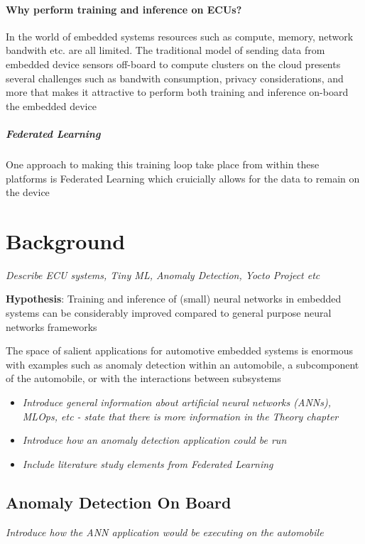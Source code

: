 \subsubsection{Why perform training and inference on ECUs?}

In the world of embedded systems resources such as compute, memory, network bandwith etc. are all limited. The traditional model of sending data from embedded device sensors off-board to compute clusters on the cloud presents several challenges such as bandwith consumption, privacy considerations, and more that makes it attractive to perform both training and inference on-board the embedded device

\paragraph{Federated Learning}{
	One approach to making this training loop take place from within these platforms is Federated Learning which cruicially allows for the data to remain on the device
}

\chapter{Background}
\textit{Describe ECU systems, Tiny ML, Anomaly Detection, Yocto Project etc}

\noindent \textbf{Hypothesis}: Training and inference of (small) neural networks in embedded systems can be considerably improved compared to general purpose neural networks frameworks

The space of salient applications for automotive embedded systems is enormous with examples such as anomaly detection within an automobile, a subcomponent of the automobile, or with the interactions between subsystems

\begin{itemize}
	\item \textit{Introduce general information about artificial neural networks (ANNs), MLOps, etc - state that there is more information in the Theory chapter}
	\item \textit{Introduce how an anomaly detection application could be run}
	\item \textit{Include literature study elements from Federated Learning}
\end{itemize}

\section[Anomaly Detection using Machine Learning]{Anomaly Detection On Board}
\textit{Introduce how the ANN application would be executing on the automobile}

